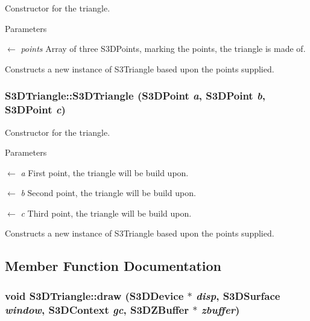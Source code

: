 Constructor for the triangle. 


\begin{DoxyParams}{Parameters}
\item[\mbox{$\leftarrow$} {\em points}]Array of three S3DPoints, marking the points, the triangle is made of.\end{DoxyParams}
Constructs a new instance of S3Triangle based upon the points supplied. \hypertarget{class_s3_d_triangle_a6709f19586226831dc2a50466e3e669e}{
\subsubsection[{S3DTriangle}]{\setlength{\rightskip}{0pt plus 5cm}S3DTriangle::S3DTriangle ({\bf S3DPoint} {\em a}, \/  {\bf S3DPoint} {\em b}, \/  {\bf S3DPoint} {\em c})}}
\label{class_s3_d_triangle_a6709f19586226831dc2a50466e3e669e}


Constructor for the triangle. 


\begin{DoxyParams}{Parameters}
\item[\mbox{$\leftarrow$} {\em a}]First point, the triangle will be build upon. \item[\mbox{$\leftarrow$} {\em b}]Second point, the triangle will be build upon. \item[\mbox{$\leftarrow$} {\em c}]Third point, the triangle will be build upon.\end{DoxyParams}
Constructs a new instance of S3Triangle based upon the points supplied. 

\subsection{Member Function Documentation}
\hypertarget{class_s3_d_triangle_acf6924908c89d6bbc5af23769243beaf}{
\subsubsection[{draw}]{\setlength{\rightskip}{0pt plus 5cm}void S3DTriangle::draw ({\bf S3DDevice} $\ast$ {\em disp}, \/  {\bf S3DSurface} {\em window}, \/  {\bf S3DContext} {\em gc}, \/  {\bf S3DZBuffer} $\ast$ {\em zbuffer})}}
\label{class_s3_d_triangle_acf6924908c89d6bbc5af23769243beaf}



